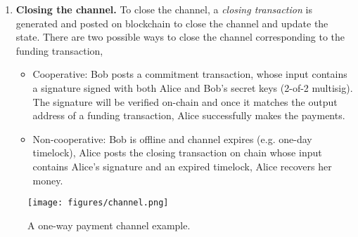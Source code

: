 \documentclass{article}
\begin{document}
\begin{enumerate}
    \item \textbf{Closing the channel.}  To close the channel, a {\em closing transaction} is generated and posted on blockchain to close the channel and update the state. There are two possible ways to close the channel corresponding to the funding transaction,
    \begin{itemize}
        \item Cooperative: Bob posts a commitment transaction, whose input contains a signature signed with both Alice and Bob's secret keys (2-of-2 {\sf multisig}). The signature will be verified on-chain and once it matches the output address of a funding transaction, Alice successfully makes the payments.  %
        \item Non-cooperative: Bob is offline and channel expires (e.g. one-day {\sf timelock}), Alice posts the closing transaction on chain whose input contains Alice's signature and an expired timelock, Alice recovers her money.
    \end{itemize}

\end{enumerate}

\begin{figure}
    \centering
    \texttt{[image: figures/channel.png]}
    \caption{A one-way payment channel example.}
    \label{fig:channel}
\end{figure}
\end{document}
